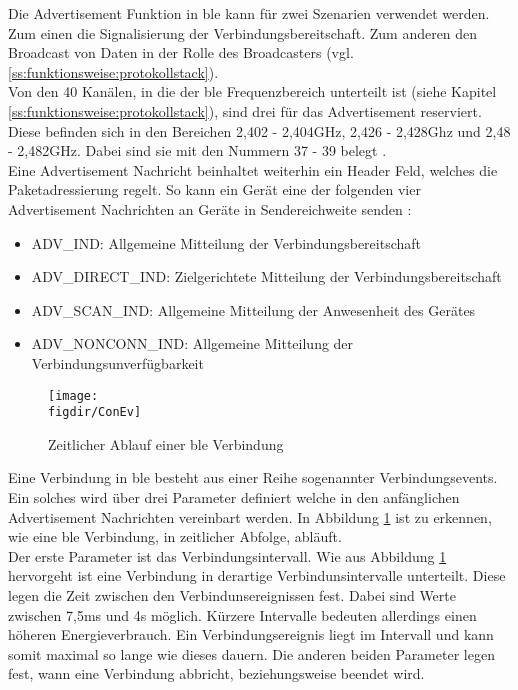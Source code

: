 \noindent Die Advertisement Funktion in \ac{ble} kann für zwei Szenarien verwendet werden. Zum einen die Signalisierung der Verbindungsbereitschaft. Zum anderen den Broadcast von Daten in der Rolle des Broadcasters (vgl. \ref{ss:funktionsweise:protokollstack}).\\

\noindent Von den 40 Kanälen, in die der \ac{ble} Frequenzbereich unterteilt ist (siehe Kapitel \ref{ss:funktionsweise:protokollstack}), sind drei für das Advertisement reserviert. Diese befinden sich in den Bereichen 2,402 - 2,404GHz, 2,426 - 2,428Ghz und 2,48 - 2,482GHz. Dabei sind sie mit den Nummern 37 - 39 belegt \cite[Seite 16]{Townsend14:GSB}.\\

\noindent Eine Advertisement Nachricht beinhaltet weiterhin ein Header Feld, welches die Paketadressierung regelt. So kann ein Gerät eine der folgenden vier Advertisement Nachrichten an Geräte in Sendereichweite senden \cite[Seite 22]{Townsend14:GSB}:
\begin{itemize}
	\item{ADV\_IND: Allgemeine Mitteilung der Verbindungsbereitschaft}
	\item{ADV\_DIRECT\_IND: Zielgerichtete Mitteilung der Verbindungsbereitschaft}
	\item{ADV\_SCAN\_IND: Allgemeine Mitteilung der Anwesenheit des Gerätes}
	\item{ADV\_NONCONN\_IND: Allgemeine Mitteilung der Verbindungsunverfügbarkeit}
\end{itemize} 

\begin{figure}[!b]
	\centering
	\texttt{[image: \\figdir/ConEv]}
	\caption{Zeitlicher Ablauf einer \ac{ble} Verbindung \cite[Seite 22]{Townsend14:GSB}}
	\label{FIG:ConEv}
\end{figure}

\noindent Eine Verbindung in \ac{ble} besteht aus einer Reihe sogenannter Verbindungsevents. Ein solches wird über drei Parameter definiert welche in den anfänglichen Advertisement Nachrichten vereinbart werden. In Abbildung \ref{FIG:ConEv} ist zu erkennen, wie eine \ac{ble} Verbindung, in zeitlicher Abfolge, abläuft.\\

\noindent Der erste Parameter ist das Verbindungsintervall. Wie aus Abbildung \ref{FIG:ConEv} hervorgeht ist eine Verbindung in derartige Verbindunsintervalle unterteilt. Diese legen die Zeit zwischen den Verbindunsereignissen fest. Dabei sind Werte zwischen 7,5ms und 4s möglich. Kürzere Intervalle bedeuten allerdings einen höheren Energieverbrauch. Ein Verbindungsereignis liegt im Intervall und kann somit maximal so lange wie dieses dauern. Die anderen beiden Parameter legen fest, wann eine Verbindung abbricht, beziehungsweise beendet wird.\\ 

